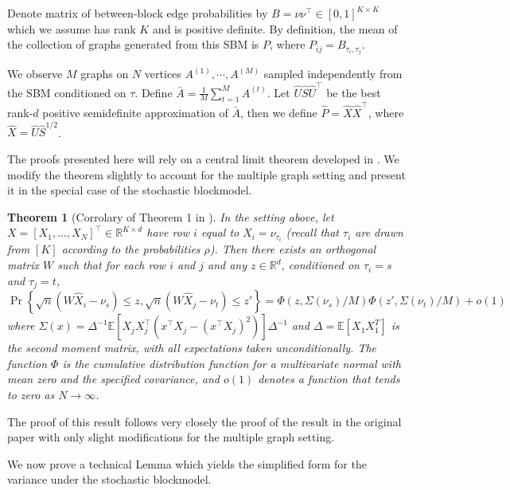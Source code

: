 \documentclass[10pt,letterpaper]{article}
\newtheorem{theorem}[fact]{Theorem}
\renewcommand{\Re}{\mathbb{R}}
\newcommand{\Ex}{\mathbb{E}}
\renewcommand{\hat}{\widehat}
\begin{document}
Denote matrix of between-block edge probabilities by $B = \nu \nu^{\top} \in[0,1]^{K\times K}$ which we assume has rank $K$ and is positive definite. 
By definition, the mean of the collection of graphs generated from this SBM is $P$, where $P_{ij} = B_{\tau_i, \tau_j}$. 

We observe $M$ graphs on $N$ vertices $A^{(1)}, \cdots, A^{(M)}$ sampled independently from the SBM conditioned on $\tau$.
Define $\bar{A} = \frac{1}{M} \sum_{t=1}^M A^{(t)}$. Let $\hat{U} \hat{S} \hat{U}^{\top}$ be the best rank-$d$ positive semidefinite approximation of $\bar{A}$, then we define $\hat{P} = \hat{X} \hat{X}^{\top}$, where $\hat{X} = \hat{U} \hat{S}^{1/2}$.




The proofs presented here will rely on a central limit theorem developed in \citet{athreya2013limit}. 
We modify the theorem slightly to account for the multiple graph setting and present it in the special case of the stochastic blockmodel.

\begin{theorem}[Corrolary of Theorem 1 in \citet{athreya2013limit}]\label{thm:clt_ext}
  In the setting above, let $X=[X_1,\dotsc,X_N]^{\top}\in\Re^{K\times d}$ have row $i$ equal to $X_i=\nu_{\tau_i}$ (recall that $\tau_i$ are drawn from $[K]$ according to the probabilities $\rho$).
	Then there exists an orthogonal matrix $W$ such that for each row $i$ and $j$ and any $z \in \Re^{d}$, conditioned on $\tau_i=s$ and $\tau_j=t$,
  \begin{equation}
    \label{eq:4}
    \Pr\left\{\sqrt{n}( W \hat{X}_i - \nu_s ) \leq z, \sqrt{n}( W \hat{X}_j - \nu_t) \leq z'\right\}
=  \Phi(z, \Sigma(\nu_s)/M)  \Phi(z', \Sigma(\nu_t)/M) +o(1)
  \end{equation}
  where $\Sigma(x) =\Delta^{-1}\Ex[ X_j X_j^\top(x^\top X_j -(x^\top
  X_j)^2)]\Delta^{-1}$ and $\Delta=\Ex[ X_1 X_{1}^{T}]$ is the second
  moment matrix, with all expectations taken unconditionally.
  The function $\Phi$ is the cumulative distribution function for a multivariate normal with mean zero and the specified covariance, and $o(1)$ denotes a function that tends to zero as $N\to \infty$.
\end{theorem}
The proof of this result follows very closely the proof of the result in the original paper with only slight modifications for the multiple graph setting.

We now prove a technical Lemma which yields the simplified form for the variance under the stochastic blockmodel.
\end{document}
